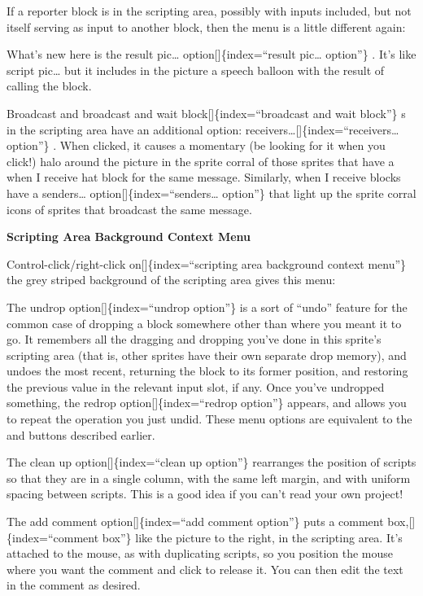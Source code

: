 \documentclass[
  letterpaper,
]{book}
\begin{document}
If a reporter block is in the scripting area, possibly with inputs
included, but not itself serving as input to another block, then the
menu is a little different again:

What's new here is the result pic\ldots{} option{[}{]}\{index=``result
pic\ldots{} option''\} . It's like script pic\ldots{} but it includes in
the picture a speech balloon with the result of calling the block.

Broadcast and broadcast and wait block{[}{]}\{index=``broadcast and wait
block''\} s in the scripting area have an additional option:
receivers\ldots{[}{]}\{index=``receivers\ldots{} option''\} . When
clicked, it causes a momentary (be looking for it when you click!) halo
around the picture in the sprite corral of those sprites that have a
when I receive hat block for the same message. Similarly, when I receive
blocks have a senders\ldots{} option{[}{]}\{index=``senders\ldots{}
option''\} that light up the sprite corral icons of sprites that
broadcast the same message.

\textbf{Scripting Area Background Context Menu}

Control-click/right-click on{[}{]}\{index=``scripting area background
context menu''\} the grey striped background of the scripting area gives
this menu:

The undrop option{[}{]}\{index=``undrop option''\} is a sort of ``undo''
feature for the common case of dropping a block somewhere other than
where you meant it to go. It remembers all the dragging and dropping
you've done in this sprite's scripting area (that is, other sprites have
their own separate drop memory), and undoes the most recent, returning
the block to its former position, and restoring the previous value in
the relevant input slot, if any. Once you've undropped something, the
redrop option{[}{]}\{index=``redrop option''\} appears, and allows you
to repeat the operation you just undid. These menu options are
equivalent to the and buttons described earlier.

The clean up option{[}{]}\{index=``clean up option''\} rearranges the
position of scripts so that they are in a single column, with the same
left margin, and with uniform spacing between scripts. This is a good
idea if you can't read your own project!

The add comment option{[}{]}\{index=``add comment option''\} puts a
comment box,{[}{]}\{index=``comment box''\} like the picture to the
right, in the scripting area. It's attached to the mouse, as with
duplicating scripts, so you position the mouse where you want the
comment and click to release it. You can then edit the text in the
comment as desired.
\end{document}
